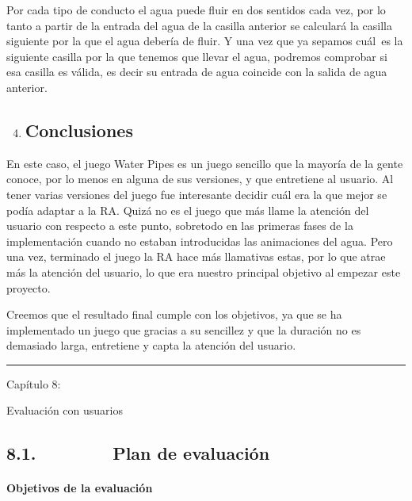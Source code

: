 \documentclass[]{article}
\begin{document}
Por cada tipo de conducto el agua puede fluir en dos sentidos cada vez,
por lo tanto a partir de la entrada del agua de la casilla anterior se
calculará la casilla siguiente por la que el agua debería de fluir. Y
una vez que ya sepamos cuál~es la siguiente casilla por la que tenemos
que llevar el agua, podremos comprobar si esa casilla es válida, es
decir su entrada de agua coincide con la salida de agua anterior.

\begin{enumerate}
\setcounter{enumi}{3}
\item
  \subsection{Conclusiones~~~~~~~~
  ~~~~~~~~~~~~~~~~}\label{h.n7fwcmp2b2to}
\end{enumerate}

En este caso, el juego Water Pipes es un juego sencillo que la mayoría
de la gente conoce, por lo menos en alguna de sus versiones, y que
entretiene al usuario. Al tener varias versiones del juego fue
interesante decidir cuál era la que mejor se podía adaptar a la RA.
Quizá no es el juego que más llame la atención del usuario con respecto
a este punto, sobretodo en las primeras fases de la implementación
cuando no estaban introducidas las animaciones del agua. Pero una vez,
terminado el juego la RA hace más llamativas estas, por lo que atrae más
la atención del usuario, lo que era nuestro principal objetivo al
empezar este proyecto.

Creemos que el resultado final cumple con los objetivos, ya que se ha
implementado un juego que gracias a su sencillez y que la duración no es
demasiado larga, entretiene y capta la atención del usuario.

\begin{center}\rule{3in}{0.4pt}\end{center}

Capítulo 8:

Evaluación con usuarios

\subsection{8.1.~~~~~~~~Plan de evaluación}

\paragraph{Objetivos de la evaluación}\label{h.n54uwxdkrsbi}
\end{document}
